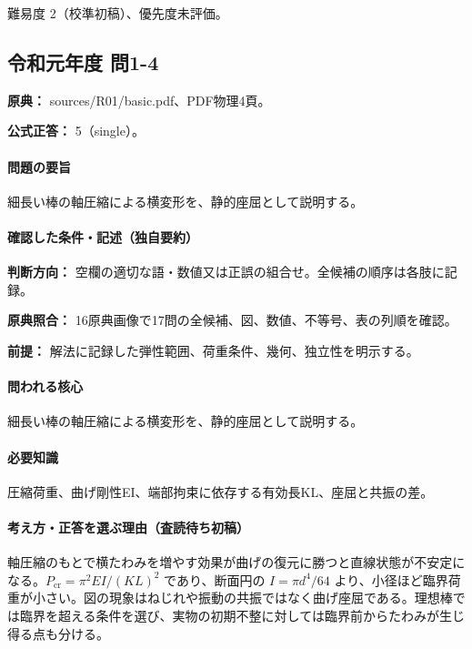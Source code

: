 \par 難易度 2（校準初稿）、優先度未評価。

\subsection{令和元年度 問1-4}
\label{q:r01-reg-basic-1-4}

\noindent\textbf{原典：} sources/R01/basic.pdf、PDF物理4頁。

\textbf{公式正答：} 5（single）。

\paragraph{問題の要旨} 細長い棒の軸圧縮による横変形を、静的座屈として説明する。

\paragraph{確認した条件・記述（独自要約）}\mbox{}\par

\noindent\textbf{判断方向：} 空欄の適切な語・数値又は正誤の組合せ。全候補の順序は各肢に記録。\par

\noindent\textbf{原典照合：} 16原典画像で17問の全候補、図、数値、不等号、表の列順を確認。\par

\noindent\textbf{前提：} 解法に記録した弾性範囲、荷重条件、幾何、独立性を明示する。\par

\paragraph{問われる核心} 細長い棒の軸圧縮による横変形を、静的座屈として説明する。

\paragraph{必要知識} 圧縮荷重、曲げ剛性EI、端部拘束に依存する有効長KL、座屈と共振の差。

\paragraph{考え方・正答を選ぶ理由（査読待ち初稿）} 軸圧縮のもとで横たわみを増やす効果が曲げの復元に勝つと直線状態が不安定になる。\(P_{\mathrm{cr}}=\pi^2EI/(KL)^2\) であり、断面円の \(I=\pi d^4/64\) より、小径ほど臨界荷重が小さい。図の現象はねじれや振動の共振ではなく曲げ座屈である。理想棒では臨界を超える条件を選び、実物の初期不整に対しては臨界前からたわみが生じ得る点も分ける。

